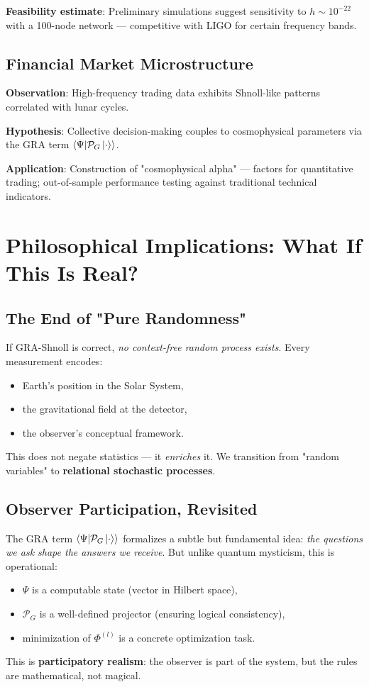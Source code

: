 \documentclass[12pt,a4paper]{article}
\theoremstyle{plain}
\theoremstyle{definition}
\theoremstyle{remark}
\newcommand{\cP}{\mathcal{P}}
\newcommand{\inner}[2]{\left\langle #1 \middle| #2 \right\rangle}
\begin{document}
\textbf{Feasibility estimate}: Preliminary simulations suggest sensitivity to $h \sim 10^{-22}$ with a 100-node network --- competitive with LIGO for certain frequency bands.

\subsection{Financial Market Microstructure}
\textbf{Observation}: High-frequency trading data exhibits Shnoll-like patterns correlated with lunar cycles.

\textbf{Hypothesis}: Collective decision-making couples to cosmophysical parameters via the GRA term $\inner{\Psi}{\cP_G \ket{\cdot}}$.

\textbf{Application}: Construction of "cosmophysical alpha" --- factors for quantitative trading; out-of-sample performance testing against traditional technical indicators.

\section{Philosophical Implications: What If This Is Real?}
\label{sec:philosophy}

\subsection{The End of "Pure Randomness"}
If GRA-Shnoll is correct, \emph{no context-free random process exists}. Every measurement encodes:
\begin{itemize}
    \item Earth's position in the Solar System,
    \item the gravitational field at the detector,
    \item the observer's conceptual framework.
\end{itemize}
This does not negate statistics --- it \emph{enriches} it. We transition from "random variables" to \textbf{relational stochastic processes}.

\subsection{Observer Participation, Revisited}
The GRA term $\inner{\Psi}{\cP_G \ket{\cdot}}$ formalizes a subtle but fundamental idea: \emph{the questions we ask shape the answers we receive}. But unlike quantum mysticism, this is operational:
\begin{itemize}
    \item $\Psi$ is a computable state (vector in Hilbert space),
    \item $\cP_G$ is a well-defined projector (ensuring logical consistency),
    \item minimization of $\Phi^{(l)}$ is a concrete optimization task.
\end{itemize}
This is \textbf{participatory realism}: the observer is part of the system, but the rules are mathematical, not magical.
\end{document}
